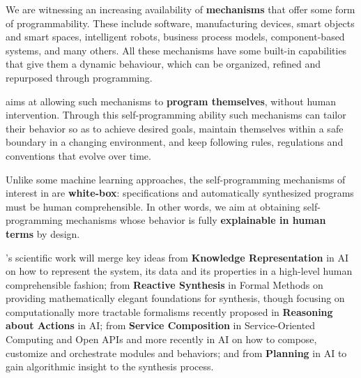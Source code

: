 



We are witnessing an increasing availability of \textbf{mechanisms} that offer
some form of programmability.
These include
software, %
manufacturing devices, %
smart objects and smart spaces, %
intelligent robots, %
business process models, %
component-based systems, %
and many others.
All these mechanisms have some built-in capabilities that give them a
dynamic behaviour, which can be organized, refined and repurposed through
programming.

\project aims at allowing such mechanisms to \textbf{program
  themselves}, without human intervention.
Through this self-programming ability such mechanisms can tailor their
behavior so as to
achieve desired goals,  maintain themselves within a safe boundary in a
changing environment, and keep following rules,
regulations and conventions that evolve over time. 

Unlike some machine learning approaches, the self-programming
mechanisms of interest in \project are \textbf{white-box}:
specifications and automatically synthesized programs must be human
comprehensible. In other words, we aim at obtaining self-programming
mechanisms whose behavior is fully \textbf{explainable in human terms}
by design.

\project's scientific work will merge key ideas 
from \textbf{Knowledge Representation} in AI on how to represent the
system, its data and its properties in a high-level human
comprehensible fashion;
from \textbf{Reactive Synthesis} in Formal Methods on providing
mathematically elegant foundations for synthesis, though focusing on
computationally more tractable formalisms recently proposed in
\textbf{Reasoning about Actions} in AI;
from \textbf{Service Composition} in Service-Oriented Computing and
Open APIs and more recently in AI on how to compose, customize and
orchestrate modules and behaviors;
%
and
from \textbf{Planning} in AI to gain algorithmic insight to the
synthesis process.



